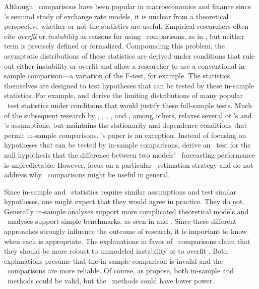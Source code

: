 \documentclass[11pt]{article}
\newcommand{\citepos}[1]{\citeauthor{#1}'s \citeyearpar{#1}}
\begin{document}
Although \oos\ comparisons have been popular in macroeconomics and
finance since \citepos{meese_empirical_1983} seminal study of exchange
rate models, it is unclear from a theoretical perspective whether or
not the statistics are useful.  Empirical researchers often cite {\em
  overfit} or {\em instability} as reasons for using \oos\
comparisons, as in \citet{stock_forecasting_2003}, but neither term is
precisely defined or formalized.  Compounding this problem, the
asymptotic distributions of these statistics are derived under
conditions that rule out either instability or overfit and allow a
researcher to use a conventional in-sample comparison---a variation of
the F-test, for example.  The statistics themselves are designed to
test hypotheses that can be tested by these in-sample statistics.  For
example, \citet{diebold_comparing_1995} and
\citet{west_asymptotic_1996} derive the limiting distributions of many
popular \oos\ test statistics under conditions that would justify
these full-sample tests.
Much of the subsequent research by \citet{chao_out_2001},
\citet{clark_tests_2001,clark_evaluating_2005},
\citet{corradi_consistent_2002,corradi_recent_2004},
\citet{clark_using_2006,clark_approximately_2007}, and
\citet{mccracken_asymptotics_2007}, among others, relaxes several of
\citepos{diebold_comparing_1995} and \citepos{west_asymptotic_1996}
assumptions, but maintains the stationarity and dependence conditions
that permit in-sample comparisons.  \citepos{giacomini_tests_2006}
paper is an exception.  Instead of
focusing on hypotheses that can be tested by in-sample comparisons,
\citet{giacomini_tests_2006} derive an \oos\ test for the null
hypothesis that the difference between two models' \oos\ forecasting
performance is unpredictable. However, \citet{giacomini_tests_2006}
focus on a particular \oos\ estimation strategy and do not address why
\oos\ comparisons might be useful in general.

Since in-sample and \oos\ statistics require similar assumptions and
test similar hypotheses, one might expect that they would agree in
practice.  They do not.  Generally in-sample analyses support more
complicated theoretical models and \oos\ analyses support simple
benchmarks, as seen in \citet{meese_empirical_1983} and
\citet{stock_forecasting_2003}.  Since these different approaches
strongly influence the outcome of research, it is important to know
when each is appropriate.  The explanations in favor of \oos\
comparisons claim that they should be more robust to unmodeled
instability \citep{clark_power_2005,giacomini_tests_2006} or to
overfit
\citep{mccracken_data_1998,clark_can_2004,hansen_in-sample_2009}.
Both explanations presume that the in-sample comparison is invalid and
the \oos\ comparisons are more reliable.  Of course, as
\citet{inoue_in-sample_2005,inoue_selection_2006} propose, both
in-sample and \oos\ methods could be valid, but the \oos\ methods
could have lower power.
\end{document}
